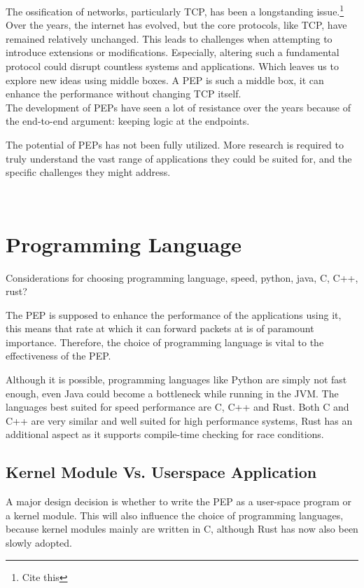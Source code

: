 \documentclass[a4paper,english, 11pt]{report}
\begin{document}
The ossification of networks, particularly TCP, has been a longstanding issue.\footnote{Cite this} Over the years, the internet has evolved, but the core protocols, like TCP, have remained relatively unchanged. This leads to challenges when attempting to introduce extensions or modifications. Especially, altering such a fundamental protocol could disrupt countless systems and applications. Which leaves us to explore new ideas using middle boxes. A PEP is such a middle box, it can enhance the performance without changing TCP itself.\\

The development of PEPs have seen a lot of resistance over the years because of the end-to-end argument: keeping logic at the endpoints.

The potential of PEPs has not been fully utilized. More research is required to truly understand the vast range of applications they could be suited for, and the specific challenges they might address. 

~\cite{tcp_extendable}

\section{Programming Language}
Considerations for choosing programming language, speed, python, java, C, C++, rust?

The PEP is supposed to enhance the performance of the applications using it, this means that rate at which it can forward packets at is of paramount importance. Therefore, the choice of programming language is vital to the effectiveness of the PEP.

Although it is possible, programming languages like Python are simply not fast enough, even Java could become a bottleneck while running in the JVM. The languages best suited for speed performance are C, C++ and Rust. Both C and C++ are very similar and well suited for high performance systems, Rust has an additional aspect as it supports compile-time checking for race conditions.

\subsection{Kernel Module Vs. Userspace Application}
A major design decision is whether to write the PEP as a user-space program or a kernel module. This will also influence the choice of programming languages, because kernel modules mainly are written in C, although Rust has now also been slowly adopted.
\end{document}
